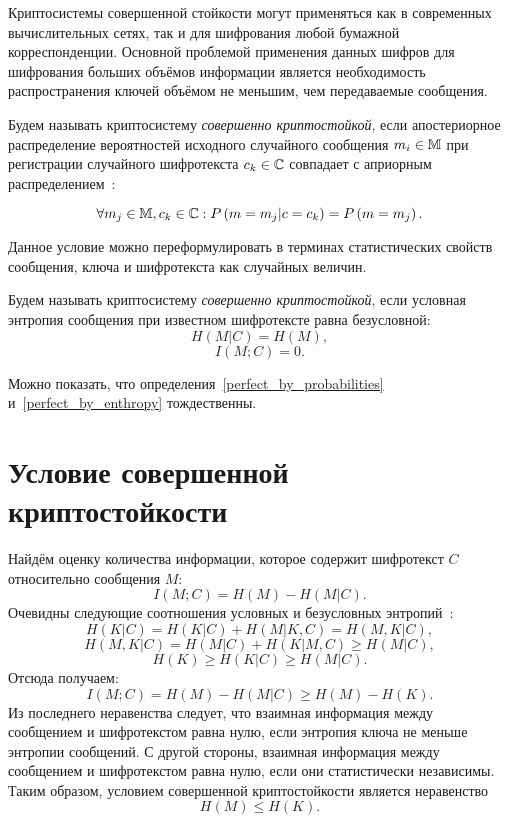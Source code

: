 Криптосистемы совершенной стойкости могут применяться как в современных вычислительных сетях, так и для шифрования любой бумажной корреспонденции. Основной проблемой применения данных шифров для шифрования больших объёмов информации является необходимость распространения ключей объёмом не меньшим, чем передаваемые сообщения.

\begin{definition}\label{perfect_by_probabilities}
Будем называть криптосистему \emph{совершенно криптостойкой}, если апостериорное распределение вероятностей исходного случайного сообщения $m_i \in \mathbb{M}$ при регистрации случайного шифротекста $c_k \in \mathbb{C}$ совпадает с априорным распределением~\cite{Gultyaeva:2010}:

	\[\forall m_j \in \mathbb{M}, c_k \in \mathbb{C}: P \left( m = m_j | c = c_k \right) = P \left( m = m_j \right).\]
\end{definition}

Данное условие можно переформулировать в терминах статистических свойств сообщения, ключа и шифротекста как случайных величин.

\begin{definition}\label{perfect_by_enthropy}
Будем называть криптосистему \emph{совершенно криптостойкой}, если условная энтропия сообщения при известном шифротексте равна безусловной:
	\[H \left( M | C \right) = H \left( M \right),\]
	\[I \left( M; C \right) = 0.\]
\end{definition}

Можно показать, что определения~\ref{perfect_by_probabilities} и~\ref{perfect_by_enthropy} тождественны.

\section[Условие]{Условие совершенной криптостойкости}

Найдём оценку количества информации, которое содержит шифротекст $C$ относительно сообщения $M$:
\[ I(M; C) = H(M) - H(M | C). \]
Очевидны следующие соотношения условных и безусловных энтропий~\cite{GabPil:2007}:
\[H(K|C)=H(K|C)+H(M|K,C)=H(M,K|C),\]
\[H(M,K|C)=H(M|C)+H(K|M,C)\geq H(M|C),\]
\[H(K)\geq H(K|C)\geq H(M|C).\]
Отсюда получаем:
 \[ I(M; C) = H(M) - H(M | C)\geq H(M)-H(K). \]
Из последнего неравенства следует, что взаимная информация между сообщением и шифротекстом равна нулю, если энтропия ключа не меньше энтропии сообщений. С другой стороны, взаимная информация между сообщением и шифротекстом равна нулю, если они статистически независимы. Таким образом, условием совершенной криптостойкости является неравенство
\[ H(M) \leq H(K).\]

